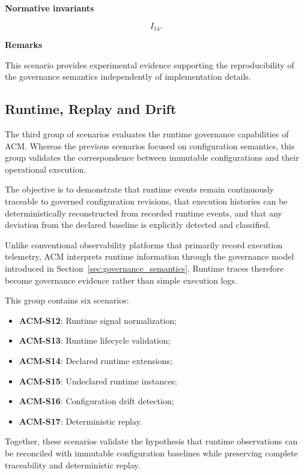 \documentclass[10pt]{article}
\begin{document}
\textbf{Normative invariants}

\[
I_{14}.
\]

\textbf{Remarks}

This scenario provides experimental evidence supporting the reproducibility of
the governance semantics independently of implementation details.

\subsection{Runtime, Replay and Drift}
\label{app:scenario_group_c}

The third group of scenarios evaluates the runtime governance capabilities of
ACM. Whereas the previous scenarios focused on configuration semantics, this
group validates the correspondence between immutable configurations and their
operational execution.

The objective is to demonstrate that runtime events remain continuously
traceable to governed configuration revisions, that execution histories can be
deterministically reconstructed from recorded runtime events, and that any
deviation from the declared baseline is explicitly detected and classified.

Unlike conventional observability platforms that primarily record execution
telemetry, ACM interprets runtime information through the governance model
introduced in Section~\ref{sec:governance_semantics}. Runtime traces therefore
become governance evidence rather than simple execution logs.

This group contains six scenarios:

\begin{itemize}
    \item \textbf{ACM-S12}: Runtime signal normalization;
    \item \textbf{ACM-S13}: Runtime lifecycle validation;
    \item \textbf{ACM-S14}: Declared runtime extensions;
    \item \textbf{ACM-S15}: Undeclared runtime instances;
    \item \textbf{ACM-S16}: Configuration drift detection;
    \item \textbf{ACM-S17}: Deterministic replay.
\end{itemize}

Together, these scenarios validate the hypothesis that runtime observations can
be reconciled with immutable configuration baselines while preserving complete
traceability and deterministic replay.
\end{document}
